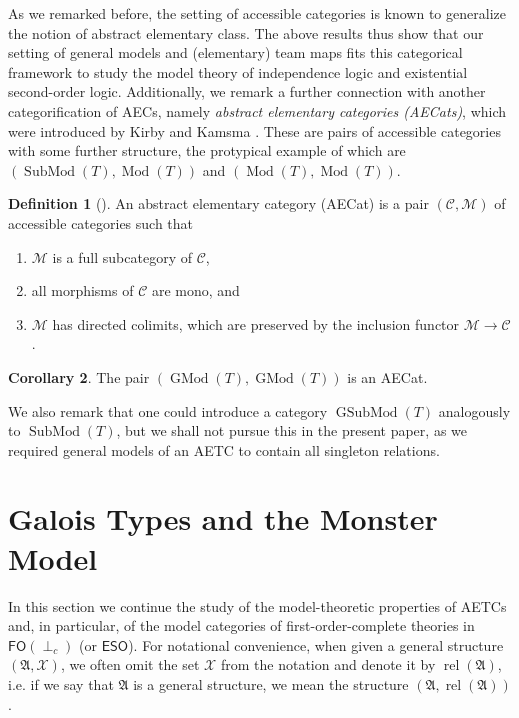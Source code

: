 \documentclass[a4paper]{amsart}
\theoremstyle{definition}
\newtheorem{definition}{Definition}[section]
\newtheorem{corollary}[definition]{Corollary}
\theoremstyle{remark}
\newcommand{\A}{\mathcal{A}}
\newcommand\eso{\mathsf{ESO}}
\newcommand\foil{\mathsf{FO}(\perp_c)}
\DeclareMathOperator{\rel}{rel}
\newcommand{\X}{\mathcal{X}}
\theoremstyle{definition}
\renewcommand{\A}{\mathfrak{A}}
\DeclareMathOperator{\Mod}{Mod}
\DeclareMathOperator{\Sub}{SubMod}
\DeclareMathOperator{\GMod}{GMod}
\DeclareMathOperator{\GSubMod}{GSubMod}
\begin{document}
As we remarked before, the setting of accessible categories is known to generalize the notion of abstract elementary class. The above results thus show that our setting of general models and (elementary) team maps fits this categorical framework to study the model theory of independence logic and existential second-order logic. Additionally, we remark a further connection with another categorification of AECs, namely \emph{abstract elementary categories (AECats)}, which were introduced by Kirby and Kamsma \cite{kirby_abstract_2008,kamsma2020kim}. These are pairs of accessible categories with some further structure, the protypical example of which are  $(\Sub(T),\Mod(T))$ and $(\Mod(T),\Mod(T))$.

\begin{definition}[\cite{kamsma2020kim}]
    An abstract elementary category (AECat) is a pair $(\mathcal C,\mathcal M)$ of accessible categories such that
    \begin{enumerate}
        \item $\mathcal M$ is a full subcategory of $\mathcal C$,
        \item all morphisms of $\mathcal C$ are mono, and
        \item $\mathcal M$ has directed colimits, which are preserved by the inclusion functor $\mathcal M\to\mathcal C$.
    \end{enumerate}
\end{definition}
\begin{corollary}
    The pair $(\GMod(T),\GMod(T))$ is an AECat.
\end{corollary}

\noindent We also remark that one could introduce a category $\GSubMod(T)$ analogously to $\Sub(T)$, but we shall not pursue this in the present paper, as we required general models of an AETC to contain all singleton relations.













\section{Galois Types and the Monster Model}\label{Section_Monster}

In this section we continue the study of the model-theoretic properties of AETCs and, in particular, of the model categories of first-order-complete theories in $\foil$ (or $\eso$). For notational convenience, when given a general structure $(\A,\X)$, we often omit the set $\X$ from the notation and denote it by $\rel(\A)$, i.e. if we say that $\A$ is a general structure, we mean the structure $(\A,\rel(\A))$.
\end{document}
